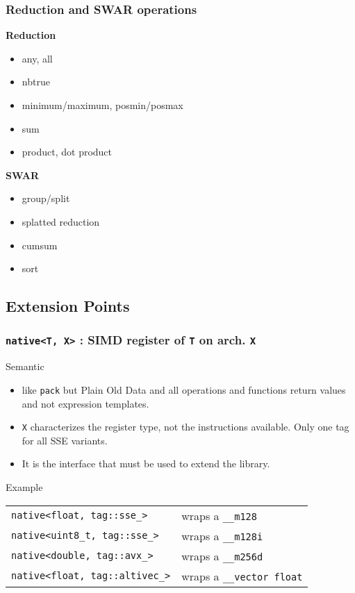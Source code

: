 \begin{frame}
	\frametitle{Reduction and SWAR operations}
	
	\begin{multicols}{2}	
	
	\textbf{Reduction}
	\begin{itemize}
		\item any, all
		\item nbtrue
		\item minimum/maximum, posmin/posmax
		\item sum
		\item product, dot product
	\end{itemize}
	\columnbreak	
	
	\textbf{SWAR}
	\begin{itemize}
		\item group/split
		\item splatted reduction
		\item cumsum
		\item sort
	\end{itemize}
	
	\vfill
	\end{multicols}
	
\end{frame}

\subsection{Extension Points}
\frame
{
	\frametitle{\texttt{native<T, X>} : SIMD register of \texttt{T} on arch. \texttt{X}}
	
      	\begin{block}{Semantic}
	\begin{itemize}\footnotesize
		\item like \lstinline{pack} but Plain Old Data and all operations and functions return values and not
		      expression templates.
		\item \lstinline{X} characterizes the register type, not the instructions available. Only one tag for all
		      SSE variants.
		\item It is the interface that must be used to extend the library.
	\end{itemize}
	\end{block}{}
	
        \begin{block}{Example}\footnotesize
	\begin{tabular}{ll}
	\lstinline{native<float, tag::sse_>} & wraps a \lstinline{__m128}\\
	\lstinline{native<uint8_t, tag::sse_>} & wraps a \lstinline{__m128i}\\
	\lstinline{native<double, tag::avx_>} & wraps a \lstinline{__m256d}\\
	\lstinline{native<float, tag::altivec_>} & wraps a \lstinline{__vector float}
	\end{tabular}
	\end{block}{}
}

